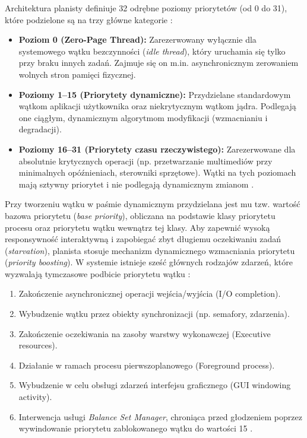 Architektura planisty definiuje 32 odrębne poziomy priorytetów (od 0 do 31), które podzielone są na trzy główne kategorie \cite{solomon2000threadScheduling}:
\begin{itemize}
	\item \textbf{Poziom 0 (Zero-Page Thread):} Zarezerwowany wyłącznie dla systemowego wątku bezczynności (\textit{idle thread}), który uruchamia się tylko przy braku innych zadań. Zajmuje się on m.in. asynchronicznym zerowaniem wolnych stron pamięci fizycznej.
	\item \textbf{Poziomy 1--15 (Priorytety dynamiczne):} Przydzielane standardowym wątkom aplikacji użytkownika oraz niekrytycznym wątkom jądra. Podlegają one ciągłym, dynamicznym algorytmom modyfikacji (wzmacnianiu i degradacji).
	\item \textbf{Poziomy 16--31 (Priorytety czasu rzeczywistego):} Zarezerwowane dla absolutnie krytycznych operacji (np. przetwarzanie multimediów przy minimalnych opóźnieniach, sterowniki sprzętowe). Wątki na tych poziomach mają sztywny priorytet i nie podlegają dynamicznym zmianom \cite{msLearnPriorityBoosts}.
\end{itemize}

Przy tworzeniu wątku w paśmie dynamicznym przydzielana jest mu tzw. wartość bazowa priorytetu (\textit{base priority}), obliczana na podstawie klasy priorytetu procesu oraz priorytetu wątku wewnątrz tej klasy. Aby zapewnić wysoką responsywność interaktywną i zapobiegać zbyt długiemu oczekiwaniu zadań (\textit{starvation}), planista stosuje mechanizm dynamicznego wzmacniania priorytetu (\textit{priority boosting}). W systemie istnieje sześć głównych rodzajów zdarzeń, które wyzwalają tymczasowe podbicie priorytetu wątku \cite{bsodTutorialsQuantumBoost}:
\begin{enumerate}
	\item Zakończenie asynchronicznej operacji wejścia/wyjścia (I/O completion).
	\item Wybudzenie wątku przez obiekty synchronizacji (np. semafory, zdarzenia).
	\item Zakończenie oczekiwania na zasoby warstwy wykonawczej (Executive resources).
	\item Działanie w ramach procesu pierwszoplanowego (Foreground process).
	\item Wybudzenie w celu obsługi zdarzeń interfejsu graficznego (GUI windowing activity).
	\item Interwencja usługi \textit{Balance Set Manager}, chroniąca przed głodzeniem poprzez wywindowanie priorytetu zablokowanego wątku do wartości 15 \cite{duffyBalanceSetManager}.
\end{enumerate}

